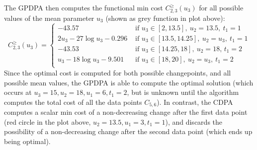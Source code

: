 \documentclass{article}
\begin{document}
The GPDPA then computes the functional min cost $C^\geq_{2,3}(u_3)$ for all
possible values of the mean parameter $u_3$ (shown as grey function in plot
above):
\begin{equation}
C^\geq_{2,3}(u_3)  =
\begin{cases}
  -43.57 & \text{ if } u_3\in[2, 13.5],\ u_2=13.5,\ t_1=1\\
  2u_3 -27 \log u_3 -0.296 & \text{ if } u_3\in[13.5, 14.25],\ u_2=u_3,\ t_1=1\\
  -43.53 & \text{ if } u_3\in[14.25, 18],\ u_2=18,\, t_1=2\\
  u_3 -18 \log u_3 -9.501  & \text{ if } u_3\in[18, 20],\ u_2=u_3,\ t_1=2\\
\end{cases}
\end{equation}
Since the optimal cost is computed for both possible changepoints, and
all possible mean values, the GPDPA is able to compute the optimal
solution (which occurs at $u_3=15, u_2=18, u_1=6, t_1=2$, but is
unknown until the algorithm computes the total cost of all the data
points $C_{5,6}$). In contrast, the CDPA computes a scalar min cost of
a non-decreasing change after the first data point (red circle in the
plot above, $u_2=13.5, u_1=3, t_1=1$), and discards the possibility of
a non-decreasing change after the second data point (which ends up
being optimal).


\end{document}
